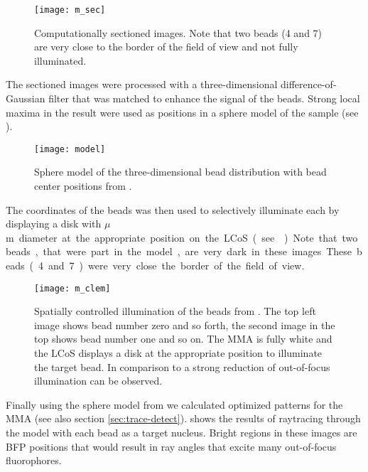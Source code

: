 \begin{figure}[H]
  \centering
  \texttt{[image: m\_sec]}
  \caption{Computationally sectioned images. Note that two beads (4
    and 7) are very close to the border of the field of view and not
    fully illuminated.}
  \label{fig:m_sec}
\end{figure}

The sectioned images were processed with a three-dimensional
difference-of-Gaussian filter that was matched to enhance the signal
of the beads. Strong local maxima in the result were used as positions
in a sphere model of the sample (see ).

\begin{figure}[H]
  \centering
  \texttt{[image: model]}
  \caption{Sphere model of the three-dimensional bead distribution
    with bead center positions from .}
  \label{fig:model}
\end{figure}


The coordinates of the beads was then used to selectively illuminate
each by displaying a disk with \unit[3]{$\mu$ m} diameter at the
appropriate position on the LCoS (see ). Note that
two beads, that were part in the model, are very dark in these
images. These beads (4 and 7) were very close the border of the field
of view.

\begin{figure}[H]
  \centering
  \texttt{[image: m\_clem]}
  \caption{Spatially controlled illumination of the beads from
    . The top left image shows bead number zero and
    so forth, the second image in the top shows bead number one and so
    on. The MMA is fully white and the LCoS displays a disk at the
    appropriate position to illuminate the target bead. In comparison
    to  a strong reduction of out-of-focus
    illumination can be observed.}
  \label{fig:m_clem}
\end{figure}


Finally using the sphere model from  we calculated
optimized patterns for the MMA (see also section
\ref{sec:trace-detect}).  shows the results of
raytracing through the model with each bead as a target
nucleus. Bright regions in these images are BFP positions that would
result in ray angles that excite many out-of-focus fluorophores. 

